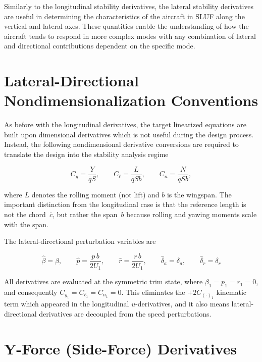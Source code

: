 \documentclass[11pt]{article}
\newcommand{\qbar}{\bar{q}}
\begin{document}
Similarly to the longitudinal stability derivatives, the lateral stability derivatives are useful in determining the
characteristics of the aircraft in SLUF along the vertical and lateral axes.
These quantities enable the understanding of how the aircraft tends to respond in more complex modes with any
combination of lateral and directional contributions dependent on the specific mode.

\section{Lateral-Directional Nondimensionalization Conventions}

As before with the longitudinal derivatives, the target linearized equations are built upon dimensional derivatives
which is not useful during the design process.
Instead, the following nondimensional derivative conversions are required to translate the design into the
stability analysis regime

\begin{equation}\label{eq:equation_31}
C_y = \frac{Y}{\qbar S}, \qquad
C_\ell = \frac{L}{\qbar S b}, \qquad
C_n = \frac{N}{\qbar S b},
\end{equation}

where $L$ denotes the rolling moment (not lift) and $b$ is the wingspan.
The important distinction from the longitudinal case is that the reference length is not the chord~$\bar c$, but
rather the span~$b$ because rolling and yawing moments scale with the span.

The lateral-directional perturbation variables are

\begin{equation}\label{eq:equation_32}
\hat\beta = \beta, \qquad
\hat p = \frac{p\,b}{2U_1}, \qquad
\hat r = \frac{r\,b}{2U_1}, \qquad
\hat{\delta}_a = \delta_a, \qquad
\hat{\delta}_r = \delta_r
\end{equation}

All derivatives are evaluated at the symmetric trim state, where
$\beta_1 = p_1 = r_1 = 0$, and consequently $C_{y_1} = C_{\ell_1} = C_{n_1} = 0$.
This eliminates the $+2C_{(\cdot)_1}$ kinematic term which appeared in the longitudinal $u$-derivatives, and it also
means lateral-directional derivatives are decoupled from the speed perturbations.

\section{Y-Force (Side-Force) Derivatives}
\end{document}
